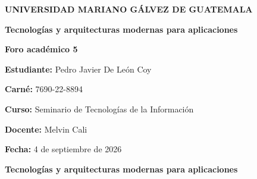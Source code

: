 \documentclass[12pt,letterpaper]{article}
\begin{document}

\begin{titlepage}

\begin{center}

\vspace*{1.5cm}

\textbf{UNIVERSIDAD MARIANO GÁLVEZ DE GUATEMALA}

\vspace{2cm}

{\Large\textbf{Tecnologías y arquitecturas modernas para aplicaciones}}

\vspace{0.7cm}

\textbf{Foro académico 5}

\vfill

\begin{flushleft}

\textbf{Estudiante:} Pedro Javier De León Coy

\vspace{0.4cm}

\textbf{Carné:} 7690-22-8894

\vspace{0.4cm}

\textbf{Curso:} Seminario de Tecnologías de la Información

\vspace{0.4cm}

\textbf{Docente:} Melvin Cali

\vspace{0.4cm}

\textbf{Fecha:} 4 de septiembre de 2026

\end{flushleft}

\vfill

\end{center}

\end{titlepage}


\justifying

\begin{center}
{\Large\textbf{Tecnologías y arquitecturas modernas para aplicaciones}}
\end{center}
\end{document}
